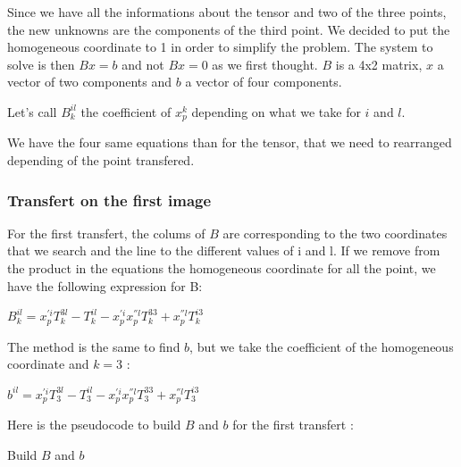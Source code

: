 \documentclass{report}
\begin{document}
Since we have all the informations about the tensor and two of the three points, the new unknowns are the components of the third point. We decided to put the homogeneous coordinate to 1 in order to simplify the problem. The system to solve is then $Bx=b$ and not $Bx=0$ as we first thought. $B$ is a 4x2 matrix, $x$ a vector of two components and $b$ a vector of four components. 

Let's call $B_{k}^{il}$ the coefficient of $x_{p}^{k}$ depending on what we take for $i$ and $l$. 

We have the four same equations than for the tensor, that we need to rearranged depending of the point transfered.


\subsubsection{Transfert on the first image}
For the first transfert, the colums of $B$ are corresponding to the two coordinates that we search and the line to the different values of i and l. If we remove from the product in the equations the homogeneous coordinate for all the point, we have the following expression for B:

\begin{center}
$B_{k}^{il} = x_{p}^{'i}T_{k}^{3l} - T_{k}^{il} - x_{p}^{'i}x_{p}^{''l}T_{k}^{33} + x_{p}^{''l}T_{k}^{i3}$
\end{center}

The method is the same to find $b$, but we take the coefficient of the homogeneous coordinate and $k=3$ : 

\begin{center}
$b^{il} = x_{p}^{'i}T_{3}^{3l} - T_{3}^{il} - x_{p}^{'i}x_{p}^{''l}T_{3}^{33} + x_{p}^{''l}T_{3}^{i3}$
\end{center}


Here is the pseudocode to build $B$ and $b$ for the first transfert : 
\newpage
\begin{algorithm}
\SetLine
\caption{Build $B$ and $b$}
\SetLine
{}
\end{algorithm}
\end{document}
